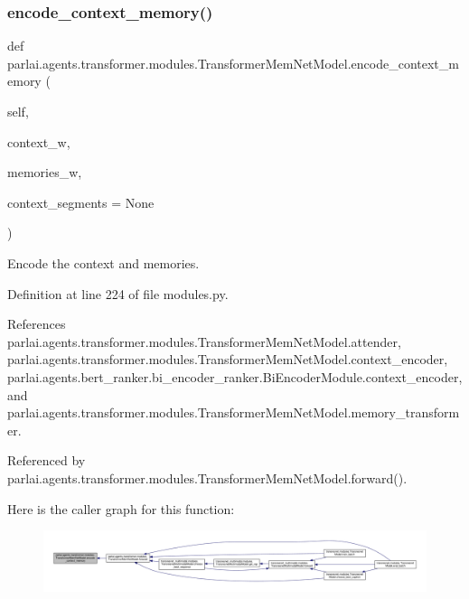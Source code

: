 \subsubsection{\texorpdfstring{encode\+\_\+context\+\_\+memory()}{encode\_context\_memory()}}
{\footnotesize\ttfamily def parlai.\+agents.\+transformer.\+modules.\+Transformer\+Mem\+Net\+Model.\+encode\+\_\+context\+\_\+memory (\begin{DoxyParamCaption}\item[{}]{self,  }\item[{}]{context\+\_\+w,  }\item[{}]{memories\+\_\+w,  }\item[{}]{context\+\_\+segments = {\ttfamily None} }\end{DoxyParamCaption})}

\begin{DoxyVerb}Encode the context and memories.\end{DoxyVerb}
 

Definition at line 224 of file modules.\+py.



References parlai.\+agents.\+transformer.\+modules.\+Transformer\+Mem\+Net\+Model.\+attender, parlai.\+agents.\+transformer.\+modules.\+Transformer\+Mem\+Net\+Model.\+context\+\_\+encoder, parlai.\+agents.\+bert\+\_\+ranker.\+bi\+\_\+encoder\+\_\+ranker.\+Bi\+Encoder\+Module.\+context\+\_\+encoder, and parlai.\+agents.\+transformer.\+modules.\+Transformer\+Mem\+Net\+Model.\+memory\+\_\+transformer.



Referenced by parlai.\+agents.\+transformer.\+modules.\+Transformer\+Mem\+Net\+Model.\+forward().

Here is the caller graph for this function\+:
\nopagebreak
\begin{figure}[H]
\begin{center}
\leavevmode
\includegraphics[width=350pt]{classparlai_1_1agents_1_1transformer_1_1modules_1_1TransformerMemNetModel_a12c6c4a26be5401e61c43ec4aa886812_icgraph}
\end{center}
\end{figure}
\mbox{\label{classparlai_1_1agents_1_1transformer_1_1modules_1_1TransformerMemNetModel_a8c27f924c01b5017c7968b9d98969496}} 
